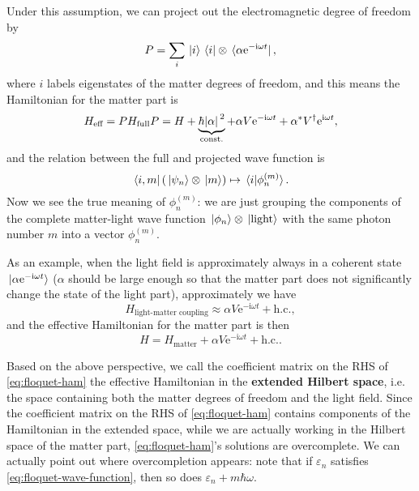 \documentclass[hyperref, a4paper]{article}
\newcommand*{\ii}{\mathrm{i}}
\newcommand*{\ee}{\mathrm{e}}
\newcommand*{\const}{\mathrm{const}}
\newcommand*{\concept}[1]{{\textbf{#1}}}
\begin{document}
Under this assumption, we can project out the electromagnetic degree of freedom by 
\begin{equation}
    P = \sum_{i} \ket*{i} \bra*{i} \otimes \bra*{\alpha \ee^{- \ii \omega t}}, 
    \label{eq:from-extended-to-matter}
\end{equation} 
where $i$ labels eigenstates of the matter degrees of freedom,
and this means the Hamiltonian for the matter part is 
\begin{equation}
    H_{\text{eff}} = P H_{\text{full}} P = 
    H + \underbrace{\hbar \abs*{\alpha}^2 }_{\const.} + \alpha V \ee^{- \ii \omega t} + \alpha^* V^\dagger \ee^{\ii \omega t},
\end{equation}
and the relation between the full and projected wave function is 
\begin{equation}
    \bra*{i, m} (\ket*{\psi_n} \otimes \ket*{m}) \mapsto \braket*{i}{\phi^{(m)}_n}.
\end{equation}
Now we see the true meaning of $\phi^{(m)}_n$:
we are just grouping the components of the complete matter-light wave function 
$\ket*{\phi_n} \otimes \ket*{\text{light}}$
with the same photon number $m$
into a vector $\phi_n^{(m)}$.

As an example, when the light field is approximately always in a coherent state
$\ket*{\alpha \ee^{- \ii \omega t}}$
($\alpha$ should be large enough so that the matter part 
does not significantly change the state of the light part), 
approximately we have 
\begin{equation}
    H_{\text{light-matter coupling}} \approx
    \alpha V \ee^{- \ii \omega t} + \text{h.c.},
\end{equation}
and the effective Hamiltonian for the matter part is then  
\begin{equation}
    H = H_{\text{matter}} + \alpha V \ee^{- \ii \omega t} + \text{h.c.}.
\end{equation}

Based on the above perspective, 
we call the coefficient matrix on the RHS of \eqref{eq:floquet-ham}
the effective Hamiltonian in the \concept{extended Hilbert space}, 
i.e. the space containing both the matter degrees of freedom 
and the light field.
Since the coefficient matrix on the RHS of \eqref{eq:floquet-ham} 
contains components of the Hamiltonian in the extended space, 
while we are actually working in the Hilbert space of the matter part,
\eqref{eq:floquet-ham}'s solutions are overcomplete.
We can actually point out where overcompletion appears:
note that if $\varepsilon_n$ satisfies \eqref{eq:floquet-wave-function},
then so does $\varepsilon_n + m \hbar \omega$.
\end{document}
